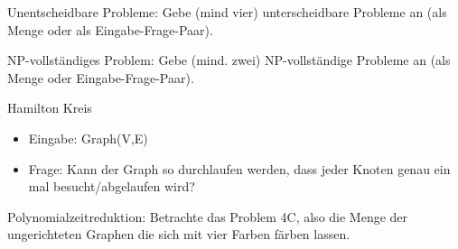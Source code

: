 \documentclass[10pt, a4paper]{exam}
\begin{document}
\begin{questions}

  \question Unentscheidbare Probleme: Gebe (mind vier) unterscheidbare Probleme an (als Menge oder als Eingabe-Frage-Paar).
  \begin{solution}
  \end{solution}

  \question NP-vollständiges Problem: Gebe (mind. zwei) NP-vollständige Probleme an (als Menge oder Eingabe-Frage-Paar).
  \begin{solution}

    Hamilton Kreis
    \begin{itemize}
      \item Eingabe: Graph(V,E)
      \item Frage: Kann der Graph so durchlaufen werden, dass jeder Knoten genau ein mal besucht/abgelaufen wird?
    \end{itemize}


  \end{solution}

  \question Polynomialzeitreduktion: Betrachte das Problem 4C, also die Menge der ungerichteten Graphen die sich mit vier Farben färben lassen.
\end{questions}
\end{document}
